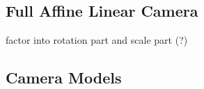 \documentclass{article}
\begin{document}
\subsection{Full Affine Linear Camera}
factor into rotation part and scale part (?)


\subsection{Camera Models}
\end{document}
